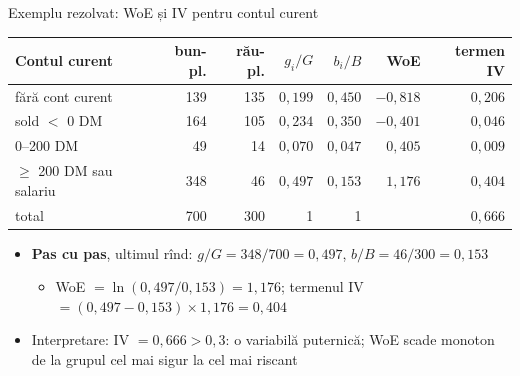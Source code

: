 \begin{frame}{Exemplu rezolvat: WoE și IV pentru contul curent}
\itemsize{\footnotesize}
\begin{center}
\scriptsize
\begin{tabular}{lrrrrrr}
\toprule
Contul curent & bun-pl. & rău-pl. & $g_i/G$ & $b_i/B$ & WoE & termen IV \\
\midrule
fără cont curent & 139 & 135 & $0{,}199$ & $0{,}450$ & $-0{,}818$ & $0{,}206$ \\
sold $<$ 0 DM & 164 & 105 & $0{,}234$ & $0{,}350$ & $-0{,}401$ & $0{,}046$ \\
0--200 DM & 49 & 14 & $0{,}070$ & $0{,}047$ & $0{,}405$ & $0{,}009$ \\
$\ge$ 200 DM sau salariu & 348 & 46 & $0{,}497$ & $0{,}153$ & $1{,}176$ & $0{,}404$ \\
total & 700 & 300 & 1 & 1 & & $0{,}666$ \\
\bottomrule
\end{tabular}
\end{center}
\begin{itemize}
    \item \textbf{Pas cu pas}, ultimul rînd: $g/G = 348/700 = 0{,}497$, $b/B = 46/300 = 0{,}153$
    \begin{itemize}
        \item WoE $= \ln(0{,}497/0{,}153) = 1{,}176$; termenul IV $= (0{,}497 - 0{,}153) \times 1{,}176 = 0{,}404$
    \end{itemize}
    \item Interpretare: IV $= 0{,}666 > 0{,}3$: o variabilă puternică; WoE scade monoton de la grupul cel mai sigur la cel mai riscant
\end{itemize}
\end{frame}

